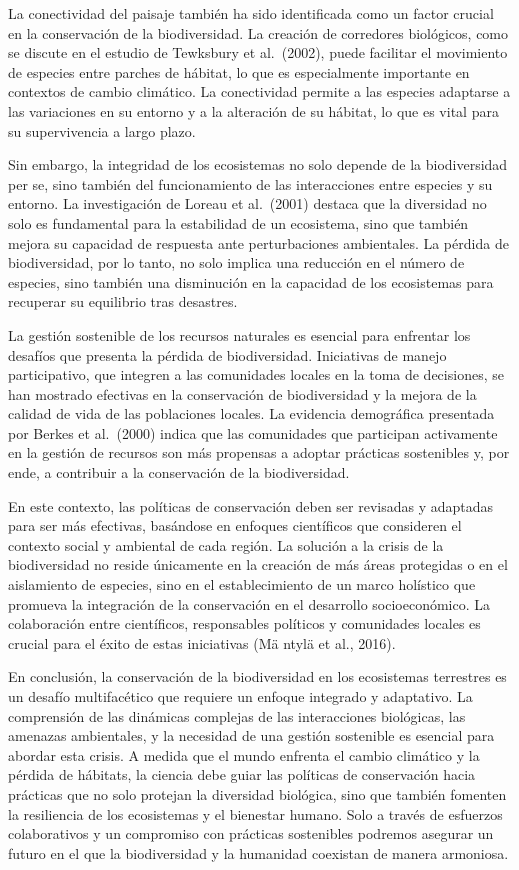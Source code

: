 \documentclass[
  letterpaper,
  DIV=11,
  numbers=noendperiod,
  oneside]{scrreprt}
\begin{document}
La conectividad del paisaje también ha sido identificada como un factor
crucial en la conservación de la biodiversidad. La creación de
corredores biológicos, como se discute en el estudio de Tewksbury et
al.~(2002), puede facilitar el movimiento de especies entre parches de
hábitat, lo que es especialmente importante en contextos de cambio
climático. La conectividad permite a las especies adaptarse a las
variaciones en su entorno y a la alteración de su hábitat, lo que es
vital para su supervivencia a largo plazo.

Sin embargo, la integridad de los ecosistemas no solo depende de la
biodiversidad per se, sino también del funcionamiento de las
interacciones entre especies y su entorno. La investigación de Loreau et
al.~(2001) destaca que la diversidad no solo es fundamental para la
estabilidad de un ecosistema, sino que también mejora su capacidad de
respuesta ante perturbaciones ambientales. La pérdida de biodiversidad,
por lo tanto, no solo implica una reducción en el número de especies,
sino también una disminución en la capacidad de los ecosistemas para
recuperar su equilibrio tras desastres.

La gestión sostenible de los recursos naturales es esencial para
enfrentar los desafíos que presenta la pérdida de biodiversidad.
Iniciativas de manejo participativo, que integren a las comunidades
locales en la toma de decisiones, se han mostrado efectivas en la
conservación de biodiversidad y la mejora de la calidad de vida de las
poblaciones locales. La evidencia demográfica presentada por Berkes et
al.~(2000) indica que las comunidades que participan activamente en la
gestión de recursos son más propensas a adoptar prácticas sostenibles y,
por ende, a contribuir a la conservación de la biodiversidad.

En este contexto, las políticas de conservación deben ser revisadas y
adaptadas para ser más efectivas, basándose en enfoques científicos que
consideren el contexto social y ambiental de cada región. La solución a
la crisis de la biodiversidad no reside únicamente en la creación de más
áreas protegidas o en el aislamiento de especies, sino en el
establecimiento de un marco holístico que promueva la integración de la
conservación en el desarrollo socioeconómico. La colaboración entre
científicos, responsables políticos y comunidades locales es crucial
para el éxito de estas iniciativas (Mä ntylä et al., 2016).

En conclusión, la conservación de la biodiversidad en los ecosistemas
terrestres es un desafío multifacético que requiere un enfoque integrado
y adaptativo. La comprensión de las dinámicas complejas de las
interacciones biológicas, las amenazas ambientales, y la necesidad de
una gestión sostenible es esencial para abordar esta crisis. A medida
que el mundo enfrenta el cambio climático y la pérdida de hábitats, la
ciencia debe guiar las políticas de conservación hacia prácticas que no
solo protejan la diversidad biológica, sino que también fomenten la
resiliencia de los ecosistemas y el bienestar humano. Solo a través de
esfuerzos colaborativos y un compromiso con prácticas sostenibles
podremos asegurar un futuro en el que la biodiversidad y la humanidad
coexistan de manera armoniosa.
\end{document}
